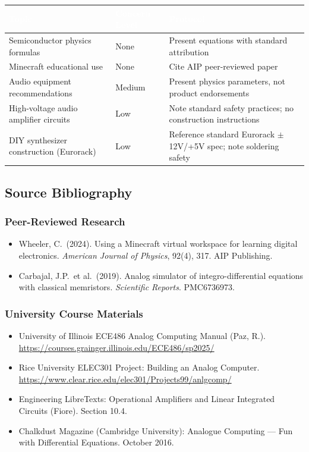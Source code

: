 \documentclass[11pt,letterpaper]{article}
\newcommand{\tableheader}[1]{\textbf{\sffamily\textcolor{white}{#1}}}
\begin{document}
\begin{center}
\begin{tabularx}{\textwidth}{L{4cm}L{3cm}X}
\toprule
{}
\tableheader{Topic} & \tableheader{Concern Level} & \tableheader{Protocol} \\
\midrule
Semiconductor physics formulas & None & Present equations with standard attribution \\
Minecraft educational use & None & Cite AIP peer-reviewed paper \\
Audio equipment recommendations & Medium & Present physics parameters, not product endorsements \\
High-voltage audio amplifier circuits & Low & Note standard safety practices; no construction instructions \\
DIY synthesizer construction (Eurorack) & Low & Reference standard Eurorack $\pm$12V/+5V spec; note soldering safety \\
\bottomrule
\end{tabularx}
\end{center}

\subsection{Source Bibliography}

\subsubsection{Peer-Reviewed Research}

\begin{itemize}[leftmargin=2em]
  \item Wheeler, C.\ (2024). Using a Minecraft virtual workspace for learning digital electronics. \textit{American Journal of Physics}, 92(4), 317. AIP Publishing.
  \item Carbajal, J.P.\ et al.\ (2019). Analog simulator of integro-differential equations with classical memristors. \textit{Scientific Reports}. PMC6736973.
\end{itemize}

\subsubsection{University Course Materials}

\begin{itemize}[leftmargin=2em]
  \item University of Illinois ECE486 Analog Computing Manual (Paz, R.). \url{https://courses.grainger.illinois.edu/ECE486/sp2025/}
  \item Rice University ELEC301 Project: Building an Analog Computer. \url{https://www.clear.rice.edu/elec301/Projects99/anlgcomp/}
  \item Engineering LibreTexts: Operational Amplifiers and Linear Integrated Circuits (Fiore). Section 10.4.
  \item Chalkdust Magazine (Cambridge University): Analogue Computing --- Fun with Differential Equations. October 2016.
\end{itemize}
\end{document}
